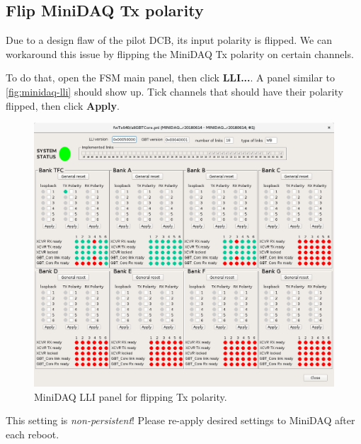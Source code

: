 \subsection{Flip MiniDAQ Tx polarity}
Due to a design flaw of the pilot DCB, its input polarity is flipped.
We can workaround this issue by flipping the MiniDAQ Tx polarity on certain
channels.

To do that, open the FSM main panel, then click \textbf{LLI...}.
A panel similar to \autoref{fig:minidaq-lli} should show up.
Tick channels that should have their polarity flipped, then click
\textbf{Apply}.

\begin{figure}[ht]
    \centering
    \includegraphics[width=\textwidth]{res/flip_tx_polarity_in_minidaq.png}
    \caption{MiniDAQ LLI panel for flipping Tx polarity.}
    \label{fig:minidaq-lli}
\end{figure}

\begin{leftbar}
    This setting is \emph{non-persistent}!
    Please re-apply desired settings to MiniDAQ after each reboot.
\end{leftbar}
